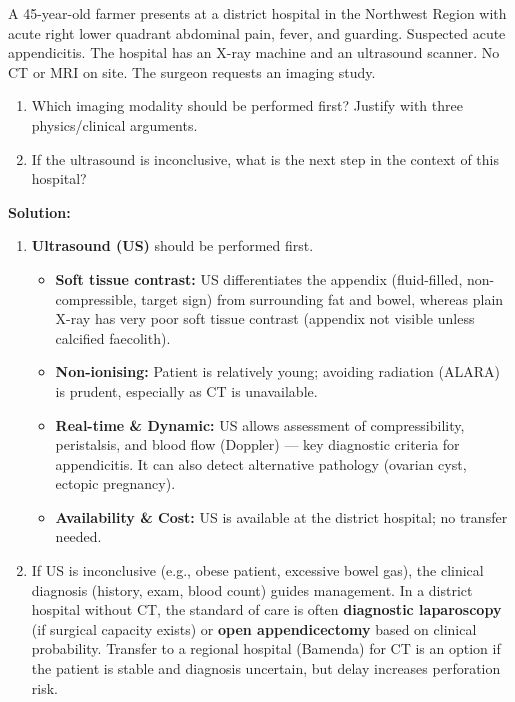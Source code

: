 \documentclass[11pt]{article}
\begin{document}
\begin{exoresolu}
A 45-year-old farmer presents at a district hospital in the Northwest Region with acute right lower quadrant abdominal pain, fever, and guarding. Suspected acute appendicitis. The hospital has an X-ray machine and an ultrasound scanner. No CT or MRI on site. The surgeon requests an imaging study.
\begin{enumerate}
    \item Which imaging modality should be performed first? Justify with three physics/clinical arguments.
    \item If the ultrasound is inconclusive, what is the next step in the context of this hospital?
\end{enumerate}
\tcblower
\textbf{Solution:}
\begin{enumerate}
    \item \textbf{Ultrasound (US)} should be performed first.
    \begin{itemize}
        \item \textbf{Soft tissue contrast:} US differentiates the appendix (fluid-filled, non-compressible, target sign) from surrounding fat and bowel, whereas plain X-ray has very poor soft tissue contrast (appendix not visible unless calcified faecolith).
        \item \textbf{Non-ionising:} Patient is relatively young; avoiding radiation (ALARA) is prudent, especially as CT is unavailable.
        \item \textbf{Real-time \& Dynamic:} US allows assessment of compressibility, peristalsis, and blood flow (Doppler) — key diagnostic criteria for appendicitis. It can also detect alternative pathology (ovarian cyst, ectopic pregnancy).
        \item \textbf{Availability \& Cost:} US is available at the district hospital; no transfer needed.
    \end{itemize}
    \item If US is inconclusive (e.g., obese patient, excessive bowel gas), the clinical diagnosis (history, exam, blood count) guides management. In a district hospital without CT, the standard of care is often \textbf{diagnostic laparoscopy} (if surgical capacity exists) or \textbf{open appendicectomy} based on clinical probability. Transfer to a regional hospital (Bamenda) for CT is an option if the patient is stable and diagnosis uncertain, but delay increases perforation risk.
\end{enumerate}
\end{exoresolu}
\end{document}
